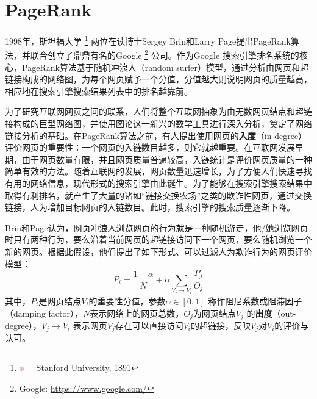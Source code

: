 \section{PageRank}
1998年，斯坦福大学
\footnote{\includegraphics[width=1.8mm]{figures/university/stanford.eps}~~~\href{https://www.stanford.edu/}{Stanford University}, 1891}
两位在读博士Sergey Brin和Larry Page提出PageRank算法\cite{brin1998anatomy}，并联合创立了鼎鼎有名的Google
\footnote{Google: \href{https://www.google.com/}{https://www.google.com/}}
公司。作为Google 搜索引擎排名系统的核心，PageRank算法基于随机冲浪人（random surfer）模型，通过分析由网页和超链接构成的网络图，为每个网页赋予一个分值，分值越大则说明网页的质量越高，相应地在搜索引擎搜索结果列表中的排名越靠前。

为了研究互联网网页之间的联系，人们将整个互联网抽象为由无数网页结点和超链接构成的巨型网络图，并使用图论这一新兴的数学工具进行深入分析，奠定了网络链接分析的基础。在PageRank算法之前，有人提出使用网页的\textbf{入度}（in-degree）评价网页的重要性：一个网页的入链数目越多，则它就越重要。在互联网发展早期，由于网页数量有限，并且网页质量普遍较高，入链统计是评价网页质量的一种简单有效的方法。随着互联网的发展，网页数量迅速增长，为了方便人们快速寻找有用的网络信息，现代形式的搜索引擎由此诞生。为了能够在搜索引擎搜索结果中取得有利排名，就产生了大量的诸如“链接交换农场”之类的欺诈性网页，通过交换链接，人为增加目标网页的入链数目。此时，搜索引擎的搜索质量逐渐下降。

Brin和Page认为，网页冲浪人浏览网页的行为就是一种随机游走，他/她浏览网页时只有两种行为，要么沿着当前网页的超链接访问下一个网页，要么随机浏览一个新的网页。根据此假设，他们提出了如下形式、可以过滤人为欺诈行为的网页评价模型：
\begin{equation}
    P_i = \frac{1-\alpha}{N} + \alpha\sum_{V_j\rightarrow V_i} \frac{P_j}{O_j}
\end{equation}
其中，$P_i$是网页结点$V_i$的重要性分值，参数$\alpha\in [0,1]$ 称作阻尼系数或阻滞因子（damping factor），$N$表示网络上的网页总数，$O_j$为网页结点$V_j$ 的\textbf{出度}（out-degree），$V_j\rightarrow V_i$ 表示网页$V_j$存在可以直接访问$V_i$的超链接，反映$V_j$对$V_i$的评价与认可。

